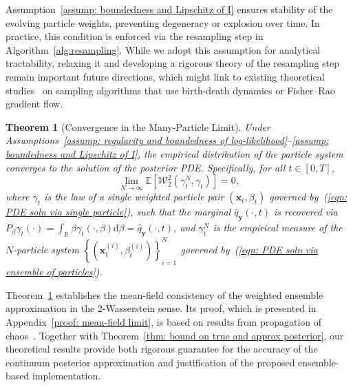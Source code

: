 \documentclass{article}
\numberwithin{equation}{section}
\newtheorem{theorem}{Theorem}[section]
\def\eqref#1{(\ref{#1})}
\newcommand{\dif}{{\mathrm{d}}}
\def\vx{{\bm{x}}}
\def\vy{{\bm{y}}}
\def\gW{{\mathcal{W}}}
\begin{document}
Assumption~\ref{assump: boundedness and Lipschitz of I} ensures stability of the evolving particle weights, preventing degeneracy or explosion over time. In practice, this condition is enforced via the resampling step in Algorithm~\ref{alg:resampling}. While we adopt this assumption for analytical tractability, relaxing it and developing a rigorous theory of the resampling step remain important future directions, which might link to existing theoretical studies~\cite{lu2023birth,chen2023sampling,yan2024learning} on sampling algorithms that use birth-death dynamics or Fisher–Rao gradient flow.

\begin{tcolorbox}[colback=lightgray,boxrule=0pt,sharp corners]
\begin{theorem}[Convergence in the Many-Particle Limit]
\label{thm: many-particle limit}
Under Assumptions~\ref{assump: regularity and boundedness of log-likelihood}–\ref{assump: boundedness and Lipschitz of I}, the empirical distribution of the particle system converges to the solution of the posterior PDE. Specifically, for all $t \in [0,T]$,
$$\lim_{N \rightarrow \infty}\mathbb{E}[\gW^2_2(\gamma^{N}_{t}, \gamma_{t})] = 0,$$
where $\gamma_t$ is the law of a single weighted particle pair $(\vx_t, \beta_t)$ governed by~\eqref{eqn: PDE soln via single particle}, such that the marginal $\widehat{q}_{\vy}(\cdot,t)$ is recovered via $P_{\beta}\gamma_t(\cdot) = \int_{\mathbb{R}}\beta\gamma_t(\cdot,\beta)\dif\beta = \widehat{q}_{\vy}(\cdot,t)$, and $\gamma^{N}_{t}$ is the empirical measure of the $N$-particle system $\left\{\left(\vx^{(i)}_t, \beta^{(i)}_t\right)\right\}_{i=1}^N$ governed by~\eqref{eqn: PDE soln via ensemble of particles}.
\end{theorem}
\end{tcolorbox}

Theorem~\ref{thm: many-particle limit} establishes the mean-field consistency of the weighted ensemble approximation in the 2-Wasserstein sense. Its proof, which is presented in Appendix~\ref{proof: mean-field limit}, is based on results from propagation of chaos~\cite{sznitman1991topics,lacker2018mean}. Together with Theorem~\ref{thm: bound on true and approx posterior}, our theoretical results provide both rigorous guarantee for the accuracy of the continuum posterior approximation and justification of the proposed ensemble-based implementation.


\end{document}
